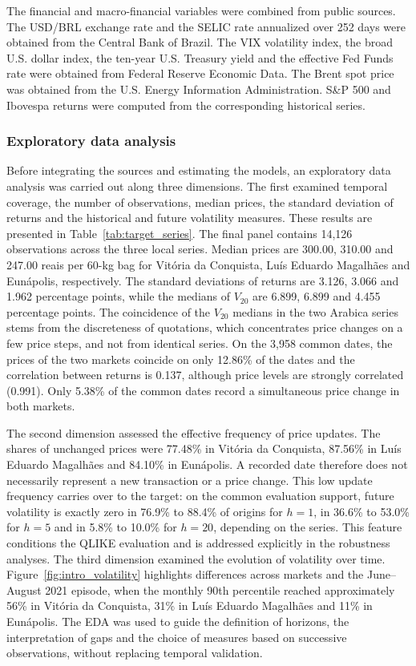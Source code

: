 \documentclass[a4paper,fleqn]{cas-sc}
\begin{document}
The financial and macro-financial variables were combined from public sources. The USD/BRL exchange rate and the SELIC rate annualized over 252 days were obtained from the Central Bank of Brazil. The VIX volatility index, the broad U.S. dollar index, the ten-year U.S. Treasury yield and the effective Fed Funds rate were obtained from Federal Reserve Economic Data. The Brent spot price was obtained from the U.S. Energy Information Administration. S\&P 500 and Ibovespa returns were computed from the corresponding historical series.

\subsubsection{Exploratory data analysis}
\label{subsec:eda}

Before integrating the sources and estimating the models, an exploratory data analysis was carried out along three dimensions. The first examined temporal coverage, the number of observations, median prices, the standard deviation of returns and the historical and future volatility measures. These results are presented in Table~\ref{tab:target_series}. The final panel contains 14,126 observations across the three local series. Median prices are 300.00, 310.00 and 247.00 reais per 60-kg bag for Vitória da Conquista, Luís Eduardo Magalhães and Eunápolis, respectively. The standard deviations of returns are 3.126, 3.066 and 1.962 percentage points, while the medians of \(V_{20}\) are 6.899, 6.899 and 4.455 percentage points. The coincidence of the \(V_{20}\) medians in the two Arabica series stems from the discreteness of quotations, which concentrates price changes on a few price steps, and not from identical series. On the 3,958 common dates, the prices of the two markets coincide on only 12.86\% of the dates and the correlation between returns is 0.137, although price levels are strongly correlated (0.991). Only 5.38\% of the common dates record a simultaneous price change in both markets.

The second dimension assessed the effective frequency of price updates. The shares of unchanged prices were 77.48\% in Vitória da Conquista, 87.56\% in Luís Eduardo Magalhães and 84.10\% in Eunápolis. A recorded date therefore does not necessarily represent a new transaction or a price change. This low update frequency carries over to the target: on the common evaluation support, future volatility is exactly zero in 76.9\% to 88.4\% of origins for \(h=1\), in 36.6\% to 53.0\% for \(h=5\) and in 5.8\% to 10.0\% for \(h=20\), depending on the series. This feature conditions the QLIKE evaluation and is addressed explicitly in the robustness analyses. The third dimension examined the evolution of volatility over time. Figure~\ref{fig:intro_volatility} highlights differences across markets and the June--August 2021 episode, when the monthly 90th percentile reached approximately 56\% in Vitória da Conquista, 31\% in Luís Eduardo Magalhães and 11\% in Eunápolis. The EDA was used to guide the definition of horizons, the interpretation of gaps and the choice of measures based on successive observations, without replacing temporal validation.
\end{document}
